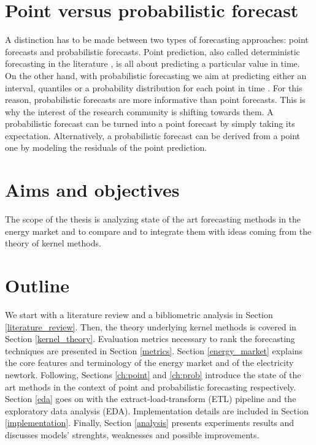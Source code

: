 \section{Point versus probabilistic forecast}
A distinction has to be made between two types of forecasting approaches: point forecasts and probabilistic forecasts.
Point prediction, also called deterministic forecasting in the literature \cite{EPF_review}, is all about predicting a particular value in time.
On the other hand, with probabilistic forecasting we aim at predicting either an interval, quantiles or a probability distribution for each point in time \cite{nowotarski}. For this reason, probabilistic forecasts are more informative than point forecasts. This is why the interest of the research community is shifting towards them.
A probabilistic forecast can be turned into a point forecast by simply taking its expectation.
Alternatively, a probabilistic forecast can be derived from a point one by modeling the residuals of the point prediction.



\section{Aims and objectives}


The scope of the thesis is analyzing state of the art forecasting methods in the energy market and to compare and to integrate them with ideas coming from the theory of kernel methods.  



\section{Outline}
We start with a literature review and a bibliometric analysis in Section \ref{literature_review}.
Then, the theory underlying kernel methods is covered in Section \ref{kernel_theory}. Evaluation metrics necessary to rank the forecasting techniques are presented in Section \ref{metrics}. Section \ref{energy_market} explains the core features and terminology of the energy market and of the electricity newtork.
Following, Sections \ref{ch:point} and \ref{ch:prob} introduce the state of the art methods in the context of point and probabilistic forecasting respectively.
Section \ref{eda} goes on with the extract-load-transform (ETL) pipeline and the exploratory data analysis (EDA). 
Implementation details are included in Section \ref{implementation}.
Finally, Section \ref{analysis} presents experiments results and discusses models' strenghts, weaknesses and possible improvements.